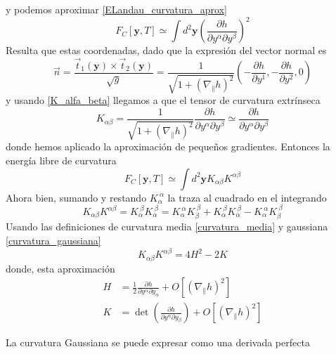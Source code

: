 y podemos aproximar \eqref{ELandau_curvatura_aprox}
\begin{equation}
F_C[\mathbf{y},T]\simeq\int d^2\mathbf{y} \left(\frac{\partial h}{\partial
  y^{\alpha} \partial y^{\beta}}\right)^2
\end{equation}
Resulta que estas coordenadas, dado que la expresión del vector normal es
\begin{equation}
\vec{n}=\frac{\vec{t}_1(\mathbf{y})\times\vec{t}_2(\mathbf{y})}{\sqrt{g}}=\frac{1}{\sqrt{1+\left(\nabla_{\|} h\right)^2}} \left( -\frac{\partial h}{\partial y^1},-\frac{\partial h}{\partial y^2},0\right)
\end{equation}
y usando  \eqref{K_alfa_beta} llegamos a que el tensor de curvatura extrínseca
\begin{equation}
K_{\alpha\beta}=\frac{1}{\sqrt{1+\left(\nabla_{\|} h\right)^2}}\frac{\partial h}{\partial
  y^{\alpha} \partial y^{\beta}}\simeq \frac{\partial h}{\partial
  y^{\alpha} \partial y^{\beta}}
\end{equation}
donde hemos aplicado la aproximación de pequeños gradientes. Entonces la
energía libre de curvatura
\begin{equation}\label{ELandau_curvatura1}
F_C[\mathbf{y},T]\simeq\int d^2\mathbf{y} K_{\alpha\beta}K^{\alpha\beta}
\end{equation} 
Ahora bien, sumando y restando $K_{\alpha}^{\ \alpha}$ la traza al cuadrado en el
integrando
\begin{equation}
K_{\alpha\beta}K^{\alpha\beta}=K_{\alpha}^{\ \beta}K_{\alpha}^{\
  \beta}=K_{\alpha}^{\ \alpha}K_{\beta}^{\ \beta}+K_{\alpha}^{\ \beta}K_{\alpha}^{\ \beta}-K_{\alpha}^{\ \alpha}K_{\beta}^{\ \beta}
\end{equation}
Usando las definiciones de curvatura media \eqref{curvatura_media} y
gaussiana \eqref{curvatura_gaussiana}
\begin{equation}
K_{\alpha\beta}K^{\alpha\beta}=4H^2-2K
\end{equation} 
donde, esta aproximación
\begin{align}
H&=\frac{1}{2}\frac{\partial h}{\partial y^{\alpha} \partial y_{\alpha}}+O\left[\left(\nabla_{\|} h\right)^2\right]\\
K&=\det \left(\frac{\partial h}{\partial y^{\alpha} \partial y_{\beta}}\right)+O\left[\left(\nabla_{\|} h\right)^2\right]
\end{align}

La curvatura Gaussiana se puede expresar como una derivada perfecta

